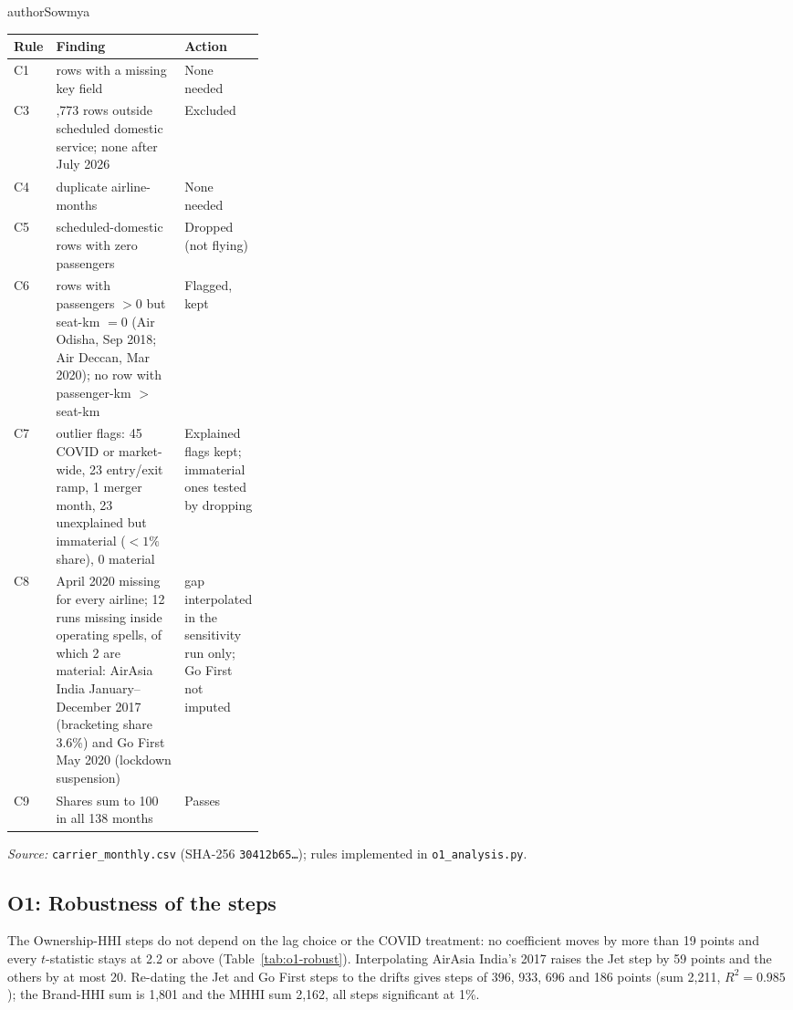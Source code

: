 \begin{authorcontribution}{authorSowmya}
\begin{minipage}{\linewidth}
\label{tab:o1-cleaning}
\centering
{\footnotesize{}\setlength{\tabcolsep}{4pt}
\begin{tabularx}{\linewidth}{|>{\raggedright\arraybackslash}p{0.05\linewidth}|>{\raggedright\arraybackslash}X|>{\raggedright\arraybackslash}p{0.27\linewidth}|}
\hline
\textbf{Rule} & \textbf{Finding} & \textbf{Action} \\
\hline
C1 & 0 rows with a missing key field & None needed \\
\hline
C3 & 1,773 rows outside scheduled domestic service; none after July 2026 & Excluded \\
\hline
C4 & 0 duplicate airline-months & None needed \\
\hline
C5 & 132 scheduled-domestic rows with zero passengers & Dropped (not flying) \\
\hline
C6 & 2 rows with passengers $>0$ but seat-km $=0$ (Air Odisha, Sep 2018; Air Deccan, Mar 2020); no row with passenger-km $>$ seat-km & Flagged, kept \\
\hline
C7 & 92 outlier flags: 45 COVID or market-wide, 23 entry/exit ramp, 1 merger month, 23 unexplained but immaterial ($<1\%$ share), 0 material & Explained flags kept; immaterial ones tested by dropping \\
\hline
C8 & April 2020 missing for every airline; 12 runs missing inside operating spells, of which 2 are material: AirAsia India January--December 2017 (bracketing share 3.6\%) and Go First May 2020 (lockdown suspension) & 2017 gap interpolated in the sensitivity run only; Go First not imputed \\
\hline
C9 & Shares sum to 100 in all 138 months & Passes \\
\hline
\end{tabularx}\par}
\vspace{4pt}
{\footnotesize{}\raggedright\textit{Source:} \texttt{carrier\_monthly.csv} (SHA-256 \texttt{30412b65\ldots}); rules implemented in \texttt{o1\_analysis.py}.\par}
\end{minipage}

\clearpage
\subsection{O1: Robustness of the steps}
\label{app:o1-robust}
The Ownership-HHI steps do not depend on the lag choice or the COVID treatment: no coefficient moves by more than 19 points and every $t$-statistic stays at 2.2 or above (Table~\ref{tab:o1-robust}). Interpolating AirAsia India's 2017 raises the Jet step by 59 points and the others by at most 20. Re-dating the Jet and Go First steps to the drifts gives steps of 396, 933, 696 and 186 points (sum 2,211, $R^2=0.985$); the Brand-HHI sum is 1,801 and the MHHI sum 2,162, all steps significant at 1\%.


\end{authorcontribution}
